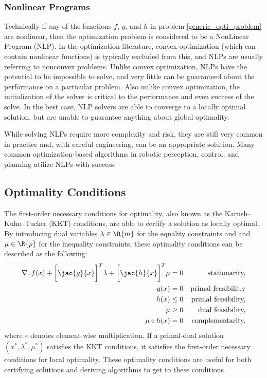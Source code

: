 \subsubsection{Nonlinear Programs}
%
Technically if any of the functions $f$, $g$, and $h$ in problem \eqref{generic_opti_problem} are nonlinear, then the optimization problem is considered to be a NonLinear Program (NLP). In the optimization literature, convex optimization (which can contain nonlinear functions) is typically excluded from this, and NLPs are usually referring to nonconvex problems. Unlike convex optimization, NLPs have the potential to be impossible to solve, and very little can be guaranteed about the performance on a particular problem. Also unlike convex optimization, the initialization of the solver is critical to the performance and even success of the solve. In the best case, NLP solvers are able to converge to a locally optimal solution, but are unable to guarantee anything about global optimality. 

While solving NLPs require more complexity and risk, they are still very common in practice and, with careful engineering, can be an appropriate solution. Many common optimization-based algorithms in robotic perception, control, and planning utilize NLPs with success.
%
\subsection{Optimality Conditions}
\label{sec:background:kkt}
%
The first-order necessary conditions for optimality, also known as the Karush–Kuhn–Tucker (KKT) conditions, are able to certify a solution as locally optimal. By introducing dual variables $\lambda \in \R{m}$ for the equality constraints and and $\mu \in \R{p}$ for the inequality constraints, these optimality conditions can be described as the following:
%
\begin{align}
    \nabla_x f(x) + \bigg[ \jac{g}{x} \bigg] ^T \lambda + \bigg[ \jac{h}{x} \bigg] ^T \mu &= 0 & \text{stationarity,} \\ 
    g(x) &= 0 & \text{primal feasibilit,y} \\ 
    h(x) &\leq 0 & \text{primal feasibility,} \\ 
    \mu & \geq 0 & \text{dual feasibility,} \\ 
    \mu \circ h(x) &= 0 & \text{complementarity,}
\end{align}
%
where $\circ$ denotes element-wise multiplication. If a primal-dual solution $(x^*, \lambda^*, \mu^*)$ satisfies the KKT conditions, it satisfies the first-order necessary conditions for local optimality. These optimality conditions are useful for both certifying solutions and deriving algorithms to get to these conditions. 
%
